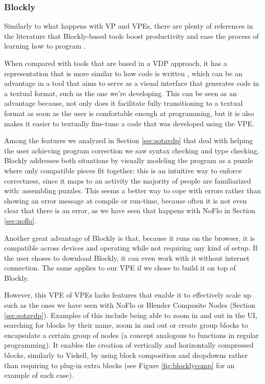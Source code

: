 \subsubsection{Blockly}
\label{sec:fblock}

Similarly to what happens with VP and VPEs, there are plenty of references
in the literature that Blockly-based tools boost productivity \cite{Marron2012} and ease the process
of learning how to program \cite{Junior2006}.

When compared with tools that are
based in a VDP approach, it has a representation that is more similar to how code
is written \cite{blockly}, which can be an advantage in a tool that aims to serve as a visual
interface that generates code in a textual format, such as the one we're developing.
This can be seen as an advantage because, not only does it facilitate fully transitioning
to a textual format as soon as the user is comfortable enough at programming,
but it is also makes it easier to textually fine-tune a code that was developed
using the VPE.

Among the features we analyzed in Section \ref{sec:sotavdp} that deal with
helping the user achieving program correction we saw syntax checking and type
checking. Blockly addresses both situations by visually modeling the program
as a puzzle where only compatible pieces fit together; this is an intuitive way
to enforce correctness, since it maps to an activity the majority of people are
familiarized with: assembling puzzles. This seems a better way to cope with errors
rather than showing an error message at compile or run-time, because often it is
not even clear that there is an error, as we have seen that happens with NoFlo in
Section \ref{sec:noflo}.

Another great advantage of Blockly is that, because it runs on the browser, it is
compatible across devices and operating while not requiring any kind of setup.
If the user choses to download Blockly, it can even work with it without internet
connection. The same applies to our VPE if we chose to build it on top of Blockly.

However, this VPE of VPEs lacks features that enable it to effectively scale up
such as the ones we have seen with NoFlo or Blender Composite Nodes (Section \ref{sec:sotavdp}).
Examples of this include being able to zoom in and out in the UI, searching for
blocks by their name, zoom in and out or create group blocks to encapsulate a certain group of
nodes (a concept analogous to functions in regular programming). It enables the
creation of vertically and horizontally compressed blocks, similarly to Viskell,
by using block composition and dropdowns rather than requiring to plug-in extra blocks
(see Figure \ref{fig:blocklycomp} for an example of each case).

